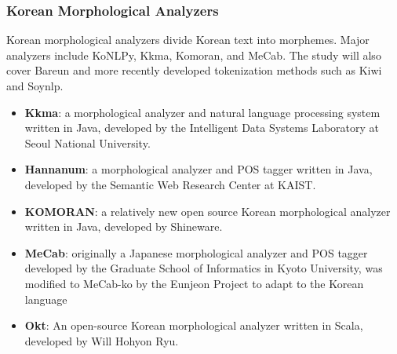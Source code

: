 \documentclass{article}
\begin{document}
\subsubsection{Korean Morphological Analyzers}

Korean morphological analyzers divide Korean text into morphemes. Major analyzers include KoNLPy, Kkma, Komoran, and MeCab. The study will also cover Bareun and more recently developed tokenization methods such as Kiwi and Soynlp. 

    \begin{itemize}
        \item \textbf{Kkma}: a morphological analyzer and natural language processing system written in Java, developed by the Intelligent Data Systems Laboratory at Seoul National University.
        \item \textbf{Hannanum}: a morphological analyzer and POS tagger written in Java, developed by the Semantic Web Research Center at KAIST.
        \item \textbf{KOMORAN}: a relatively new open source Korean morphological analyzer written in Java, developed by Shineware.
        \item \textbf{MeCab}: originally a Japanese morphological analyzer and POS tagger developed by the Graduate School of Informatics in Kyoto University, was modified to MeCab-ko by the Eunjeon Project to adapt to the Korean language
        \item \textbf{Okt}: An open-source Korean morphological analyzer written in Scala, developed by Will Hohyon Ryu.
    \end{itemize}
\end{document}
